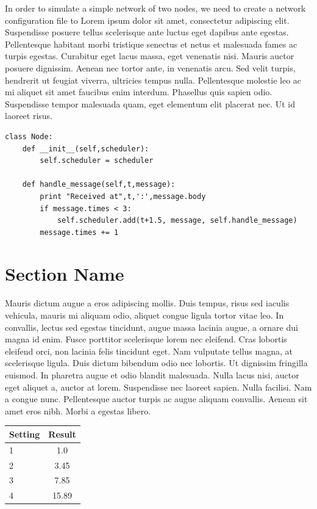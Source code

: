 \documentclass[fleqn,11pt]{article}
\begin{document}
In order to simulate a simple network of two nodes, we need to create a network configuration file to
Lorem ipsum dolor sit amet, consectetur adipiscing elit. Suspendisse
posuere tellus scelerisque ante luctus eget dapibus ante
egestas. Pellentesque habitant morbi tristique senectus et netus et
malesuada fames ac turpis egestas. Curabitur eget lacus massa, eget
venenatis nisi. Mauris auctor posuere dignissim. Aenean nec tortor
ante, in venenatis arcu. Sed velit turpis, hendrerit ut feugiat
viverra, ultricies tempus nulla. Pellentesque molestie leo ac mi
aliquet sit amet faucibus enim interdum. Phasellus quis sapien
odio. Suspendisse tempor malesuada quam, eget elementum elit placerat
nec. Ut id laoreet risus.

\begin{lstlisting}
class Node:
    def __init__(self,scheduler):
        self.scheduler = scheduler

    def handle_message(self,t,message):
        print "Received at",t,':',message.body
        if message.times < 3:
            self.scheduler.add(t+1.5, message, self.handle_message)
        message.times += 1
\end{lstlisting}

\section{Section Name}

Mauris dictum augue a eros adipiscing mollis. Duis tempus, risus sed
iaculis vehicula, mauris mi aliquam odio, aliquet congue ligula tortor
vitae leo. In convallis, lectus sed egestas tincidunt, augue massa
lacinia augue, a ornare dui magna id enim. Fusce porttitor scelerisque
lorem nec eleifend. Cras lobortis eleifend orci, non lacinia felis
tincidunt eget. Nam vulputate tellus magna, at scelerisque
ligula. Duis dictum bibendum odio nec lobortis. Ut dignissim fringilla
euismod. In pharetra augue et odio blandit malesuada. Nulla lacus
nisi, auctor eget aliquet a, auctor at lorem. Suspendisse nec laoreet
sapien. Nulla facilisi. Nam a congue nunc. Pellentesque auctor turpis
ac augue aliquam convallis. Aenean sit amet eros nibh. Morbi a egestas
libero.

\vspace{0.5cm}
\begin{tabular}{lc}
  \toprule
  Setting & Result\\
  \midrule
  1 & 1.0\\
  2 & 3.45\\
  3 & 7.85\\
  4 & 15.89\\
  \bottomrule
\end{tabular}
\vspace{0.5cm}
\end{document}
